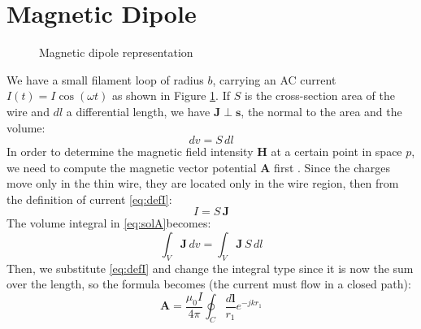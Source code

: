 \section{Magnetic Dipole}
\begin{figure}
    \centering
    \caption{Magnetic dipole representation}
    \label{fig:dipole}
\end{figure}

We have a small filament loop of radius \( b \), carrying an AC current \( I(t) = I \cos(\omega t) \) as shown in Figure \ref{fig:dipole}.
If \( S \) is the cross-section area of the wire and \( dl \) a differential length, we have \( \mathbf{J} \perp \mathbf{s} \), the normal to the area and the volume:
\[
dv = S \, dl
\]
In order to determine the magnetic field intensity \(\mathbf{H}\) at a certain point in space \( p \), we need to compute the magnetic vector potential \(\mathbf{A}\) first \cite{book-magnetism}.
Since the charges move only in the thin wire, they are located only in the wire region, then from the definition of current \ref{eq:defI}:
\[
I = S \, \mathbf{J}
\]
The volume integral in \ref{eq:solA}becomes:
\[
\int_V \mathbf{J} \, dv =  \int_V \mathbf{J} \, S \, dl
\]
Then, we substitute \ref{eq:defI} and change the integral type since it is now the sum over the length, so the formula becomes (the current must flow in a closed path):
\begin{equation}
    \mathbf{A} = \frac{\mu_0 I}{4\pi} \oint_C \frac{d\mathbf{l}}{r_1} e^{-j k r_1}
    \label{sol_A_dipole}
\end{equation}

